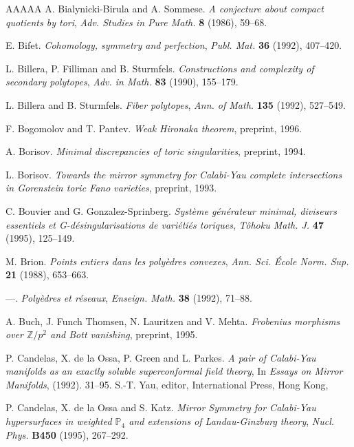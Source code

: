 \documentclass{amsart}
\theoremstyle{plain}
\theoremstyle{definition}
\begin{document}
\begin{thebibliography}{AAAAA}
A. Bialynicki-Birula and A. Sommese. \textit{A conjecture about compact quotients by tori}, \textit{Adv. Studies in Pure Math.} \textbf{8} (1986), 59--68.

E. Bifet. \textit{Cohomology, symmetry and perfection}, \textit{Publ. Mat.} \textbf{36} (1992), 407--420.

L. Billera, P. Filliman and B. Sturmfels. \textit{Constructions and complexity of secondary polytopes}, \textit{Adv. in Math.} \textbf{83} (1990), 155--179.

L. Billera and B. Sturmfels. \textit{Fiber polytopes}, \textit{Ann. of Math.} \textbf{135} (1992), 527--549.

F. Bogomolov and T. Pantev. \textit{Weak Hironaka theorem}, preprint, 1996.

A. Borisov. \textit{Minimal discrepancies of toric singularities}, preprint, 1994.

L. Borisov. \textit{Towards the mirror symmetry for Calabi-Yau complete intersections in Gorenstein toric Fano varieties}, preprint, 1993.

C. Bouvier and G. Gonzalez-Sprinberg. \textit{Syst\`eme g\'en\'erateur minimal, diviseurs essentiels et G-d\'esingularisations de vari\'eti\'es toriques}, \textit{T\^ ohoku Math. J.} \textbf{47} (1995), 125--149.

M. Brion. \textit{Points entiers dans les poly\`edres convexes}, \textit{Ann. Sci. \'Ecole Norm. Sup.} \textbf{21} (1988), 653--663.

---. \textit{Poly\`edres et r\'eseaux}, \textit{Enseign. Math.} \textbf{38} (1992), 71--88.

A. Buch, J. Funch Thomsen, N. Lauritzen and V. Mehta. \textit{Frobenius morphisms over ${\mathbb Z}/p^2$ and Bott vanishing}, preprint, 1995.

P. Candelas, X. de la Ossa, P. Green and L. Parkes. \textit{A pair of Calabi-Yau manifolds as an exactly soluble superconformal field theory}, In \textit{Essays on Mirror Manifolds}, (1992). 31--95. S.-T. Yau, editor, International Press, Hong Kong,

P. Candelas, X. de la Ossa and S. Katz. \textit{Mirror Symmetry for Calabi-Yau hypersurfaces in weighted ${\mathbb P}_4$ and extensions of Landau-Ginzburg theory}, \textit{Nucl. Phys.} \textbf{B450} (1995), 267--292.


\end{thebibliography}
\end{document}
